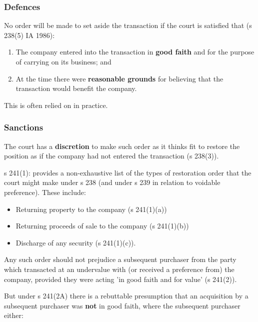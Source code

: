 \documentclass[
]{article}
\providecommand{\tightlist}{%
  \setlength{\itemsep}{0pt}\setlength{\parskip}{0pt}}
\begin{document}
\hypertarget{defences}{%
\subsubsection{Defences}\label{defences}}

No order will be made to set aside the transaction if the court is
satisfied that (s 238(5) IA 1986):

\begin{enumerate}
\tightlist
\item
  The company entered into the transaction in \textbf{good faith} and
  for the purpose of carrying on its business; and
\item
  At the time there were \textbf{reasonable grounds} for believing that
  the transaction would benefit the company.
\end{enumerate}

This is often relied on in practice.

\hypertarget{sanctions}{%
\subsubsection{Sanctions}\label{sanctions}}

The court has a \textbf{discretion} to make such order as it thinks fit
to restore the position as if the company had not entered the
transaction (s 238(3)).

s 241(1): provides a non-exhaustive list of the types of restoration
order that the court might make under s 238 (and under s 239 in relation
to voidable preference). These include:

\begin{itemize}
\tightlist
\item
  Returning property to the company (s 241(1)(a))
\item
  Returning proceeds of sale to the company (s 241(1)(b))
\item
  Discharge of any security (s 241(1)(c)).
\end{itemize}

Any such order should not prejudice a subsequent purchaser from the
party which transacted at an undervalue with (or received a preference
from) the company, provided they were acting 'in good faith and for
value' (s 241(2)).

But under s 241(2A) there is a rebuttable presumption that an
acquisition by a subsequent purchaser was \textbf{not} in good faith,
where the subsequent purchaser either:
\end{document}
